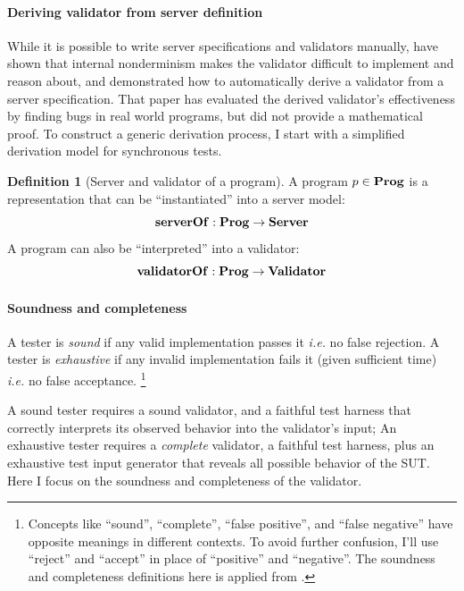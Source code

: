 \documentclass{article}
\theoremstyle{definition}
\newtheorem{definition}{Definition}
\newcommand{\Server}{\ottkw{Server}}
\newcommand{\Validator}{\ottkw{Validator}}
\newcommand{\Prog}{\ottkw{Prog}}
\newcommand{\serverOf}{\ottkw{serverOf}}
\newcommand{\validatorOf}{\ottkw{validatorOf}}
\begin{document}
\paragraph{Deriving validator from server definition}
While it is possible to write server specifications and validators manually,
\textcite{issta21} have shown that internal nonderminism makes the
validator difficult to implement and reason about, and demonstrated how to
automatically derive a validator from a server specification.  That paper has
evaluated the derived validator's effectiveness by finding bugs in real world
programs, but did not provide a mathematical proof.  To construct a generic
derivation process, I start with a simplified derivation model for synchronous
tests.

\begin{definition}[Server and validator of a program]
  A program $p\in\Prog$ is a representation that can be ``instantiated'' into a
  server model:
  \[ \serverOf:\Prog\to\Server \]
  A program can also be ``interpreted'' into a validator:
  \[ \validatorOf:\Prog\to\Validator \]
\end{definition}

\paragraph{Soundness and completeness}
A tester is {\em sound} if any valid implementation passes it {\it i.e.} no
false rejection.  A tester is {\em exhaustive} if any invalid implementation
fails it (given sufficient time) {\it i.e.} no false acceptance.
\footnote{Concepts like ``sound'', ``complete'', ``false positive'', and ``false
  negative'' have opposite meanings in different contexts.  To avoid further
  confusion, I'll use ``reject'' and ``accept'' in place of ``positive'' and
  ``negative''.  The soundness and completeness definitions here is applied from
  \textcite{Tretmans}.}
  
A sound tester requires a sound validator, and a faithful test harness
that correctly interprets its observed behavior into the validator's input; An
exhaustive tester requires a {\em complete} validator, a faithful test harness,
plus an exhaustive test input generator that reveals all possible behavior of
the SUT.  Here I focus on the soundness and completeness of the validator.
\end{document}
